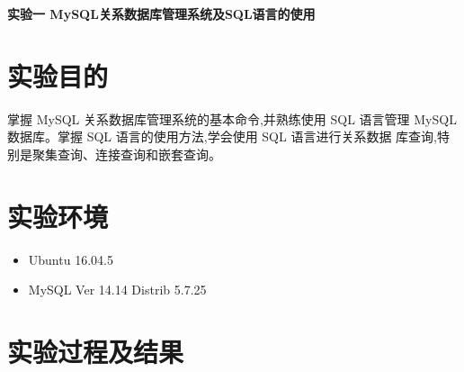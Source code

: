 \documentclass{ML}
\begin{document}
\maketitle

\tableofcontents
\newpage

\begin{center}
    \textbf{ 实验一 MySQL关系数据库管理系统及SQL语言的使用}
\end{center}

\section{实验目的}
    掌握 MySQL 关系数据库管理系统的基本命令,并熟练使用 SQL 语言管理
MySQL 数据库。掌握 SQL 语言的使用方法,学会使用 SQL 语言进行关系数据
库查询,特别是聚集查询、连接查询和嵌套查询。
\section{实验环境}
\begin{itemize}
    \item Ubuntu 16.04.5
    \item MySQL Ver 14.14 Distrib 5.7.25
\end{itemize}
\section{实验过程及结果}
\end{document}
